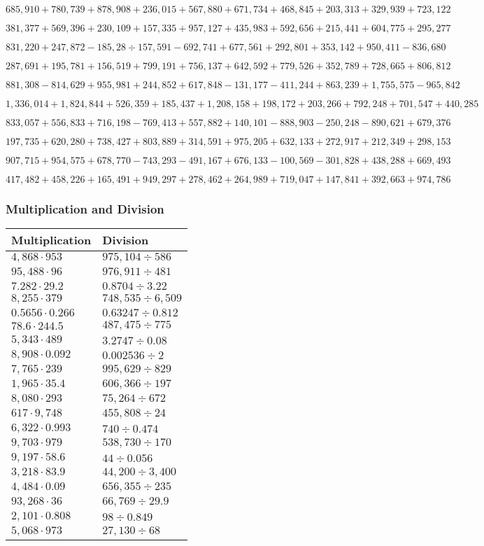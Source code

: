 \(685,910+780,739+878,908+236,015+567,880+671,734+468,845+203,313+329,939+ 723,122\)

\(381,377+569,396+230,109+157,335+957,127+435,983+592,656+215,441+604,775+295,277\)

\(831,220+247,872-185,28÷157,591-692,741+677,561+292,801+353,142+950,411-836,680\)

\(287,691+195,781+156,519+799,191+756,137+642,592+779,526+352,789+728,665+806,812\)

\(881,308-814,629+955,981+244,852+617,848-131,177-411,244+863,239+1,755,575-965,842\)

\(1,336,014+1,824,844+526,359+185,437+1,208,158+198,172+203,266+792,248+701,547+440,285\)

\(833,057+556,833+716,198-769,413+557,882+140,101-888,903-250,248-890,621+679,376\)

\(197,735+620,280+738,427+803,889+314,591+975,205+632,133+272,917+212,349+298,153\)

\(907,715+954,575+678,770-743,293-491,167+676,133-100,569-301,828+438,288+669,493\)

\(417,482+458,226+165,491+949,297+278,462+264,989+719,047+147,841+392,663+974,786\)

\hypertarget{multiplication-and-division-325}{%
\subsubsection{Multiplication and
Division}\label{multiplication-and-division-325}}

\begin{longtable}[]{@{}ll@{}}
\toprule
Multiplication & Division\tabularnewline
\midrule
\endhead
\(4,868\cdot953\) & \(975,104÷586\)\tabularnewline
\(95,488\cdot96\) & \(976,911÷481\)\tabularnewline
\(7.282\cdot29.2\) & \(0.8704÷3.22\)\tabularnewline
\(8,255\cdot379\) & \(748,535÷6,509\)\tabularnewline
\(0.5656\cdot0.266\) & \(0.63247÷0.812\)\tabularnewline
\(78.6\cdot244.5\) & \(487,475÷775\)\tabularnewline
\(5,343\cdot489\) & \(3.2747÷0.08\)\tabularnewline
\(8,908\cdot0.092\) & \(0.002536÷2\)\tabularnewline
\(7,765\cdot239\) & \(995,629÷829\)\tabularnewline
\(1,965\cdot35.4\) & \(606,366÷197\)\tabularnewline
\(8,080\cdot293\) & \(75,264÷672\)\tabularnewline
\(617\cdot9,748\) & \(455,808÷24\)\tabularnewline
\(6,322\cdot0.993\) & \(740÷0.474\)\tabularnewline
\(9,703\cdot979\) & \(538,730÷170\)\tabularnewline
\(9,197\cdot58.6\) & \(44÷0.056\)\tabularnewline
\(3,218\cdot83.9\) & \(44,200÷3,400\)\tabularnewline
\(4,484\cdot0.09\) & \(656,355÷235\)\tabularnewline
\(93,268\cdot36\) & \(66,769÷29.9\)\tabularnewline
\(2,101\cdot0.808\) & \(98÷0.849\)\tabularnewline
\(5,068\cdot973\) & \(27,130÷68\)\tabularnewline
\bottomrule
\end{longtable}

